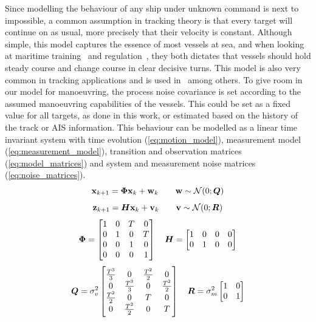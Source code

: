 Since modelling the behaviour of any ship under unknown command is next to impossible, a common assumption in tracking theory is that every target will continue on as usual, more precisely that their velocity is constant. Although simple, this model captures the essence of most vessels at sea, and when looking at maritime training~\cite{Allen2005} and regulation~\cite{IMO1972}, they both dictates that vessels should hold steady course and change course in clear decisive turns. This model is also very common in tracking applications and is used in~\cite{Reid1979,Coraluppi2000,Brekke2012,Wilthil,Vo2015,Chen2003,Habtemariam2015} among others. To give room in our model for manoeuvring, the process noise covariance is set according to the assumed manoeuvring capabilities of the vessels. This could be set as a fixed value for all targets, as done in this work, or estimated based on the history of the track or AIS information. This behaviour can be modelled as a linear time invariant system  with time evolution (\ref{eq:motion_model}), measurement model (\ref{eq:measurement_model}), transition and observation matrices (\ref{eq:model_matrices}) and system and measurement noise matrices (\ref{eq:noise_matrices}).
\begin{equation}\label{eq:motion_model}
\boldsymbol{\mathbf{x}}_{k+1} = \bm{\Phi} \boldsymbol{\mathbf{x}}_k + \boldsymbol{\mathbf{w}}_k \qquad \boldsymbol{\mathbf{w}} \sim \mathcal{N}(0;\bm{Q})
\end{equation}
\begin{equation}\label{eq:measurement_model}
\boldsymbol{\mathbf{z}}_{k+1} = \bm{H}\boldsymbol{\mathbf{x}}_k + \boldsymbol{\mathbf{v}}_k \qquad \boldsymbol{\mathbf{v}} \sim \mathcal{N}(0;\bm{R})
\end{equation}
\begin{equation}\label{eq:model_matrices}
\bm{\Phi} =	\begin{bmatrix}
1 & 0 & T & 0 \\
0 & 1 & 0 & T \\
0 & 0 & 1 & 0 \\
0 & 0 & 0 & 1 \\
\end{bmatrix}
\quad
\bm{H} =	\begin{bmatrix}
1 & 0 & 0 & 0 \\
0 & 1 & 0 & 0 \\
\end{bmatrix}
\end{equation}
\begin{equation}\label{eq:noise_matrices}
\bm{Q}	= \sigma_v^2 \begin{bmatrix}
\frac{T^3}{3} 	& 0 				& \frac{T^2}{2}	& 0 			\\
0 				& \frac{T^3}{3}  	& 0 			& \frac{T^2}{2}	\\
\frac{T^2}{2}	& 0					& T				& 0				\\
0				& \frac{T^2}{2}		& 0				& T				\\
\end{bmatrix}
\quad
\bm{R} =	\sigma_m^2 
\begin{bmatrix}
1 & 0 \\
0 & 1 \\
\end{bmatrix}
\end{equation}
